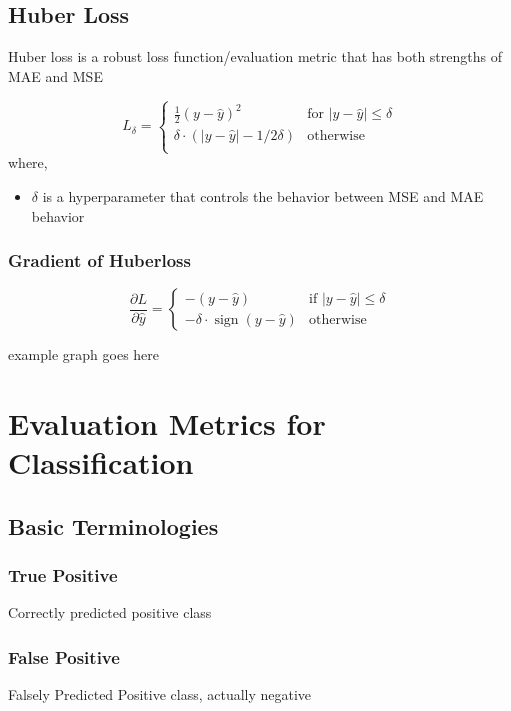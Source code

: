 \documentclass[12pt]{extarticle}
\begin{document}
\subsection{Huber Loss}
Huber loss is a robust loss function/evaluation metric that has both strengths of MAE and MSE


$$
L_\delta = 
\begin{cases} 
    \frac{1}{2}(y-\hat{y})^2 & \text{for }|y-\hat{y}| \le \delta \\
    \delta \cdot (|y-\hat{y}|-1/2 \delta) & \text{otherwise} \\
\end{cases}
$$
where, 
\begin{itemize}
    \item \( \delta \) is a hyperparameter that controls the behavior between 
        MSE and MAE behavior
\end{itemize}

\subsubsection{Gradient of Huberloss}

\[
\frac{\partial L}{\partial \hat{y}} =
\begin{cases}
-(y - \hat{y}) & \text{if } |y - \hat{y}| \leq \delta \\
-\delta \cdot \operatorname{sign}(y - \hat{y}) & \text{otherwise}
\end{cases}
\]

example graph goes here

\section{Evaluation Metrics for Classification}

\subsection{Basic Terminologies}

\subsubsection*{True Positive}
Correctly predicted positive class

\subsubsection*{False Positive}
Falsely Predicted Positive class, actually negative
\end{document}
